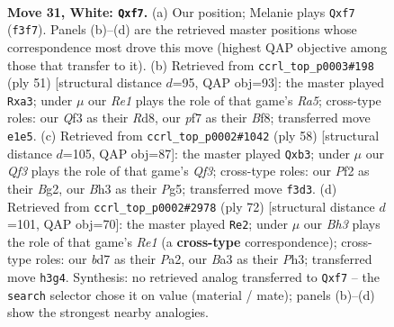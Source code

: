 \documentclass[11pt]{article}
\begin{document}
\clearpage

\begin{figure}[p]\centering
\begin{subfigure}{0.46\textwidth}\centering
\resizebox{\linewidth}{!}{%
\newchessgame
\chessboard[
  setfen={r3r2k/bp1b1pp1/p3p3/7P/8/BPqp1Q1B/P4PKP/R3R3 w - - 0 31},
  showmover=false,
  pgfstyle=straightmove, color=movearrow, markmove={f3-f7}
]}
\caption{}
\end{subfigure}\hfill
\begin{subfigure}{0.46\textwidth}\centering
\resizebox{\linewidth}{!}{%
\newchessgame
\chessboard[
  setfen={3r1bk1/1b3ppp/8/1ppPB3/r5q1/P5P1/2Q2PBP/1R1R2K1 b - - 1 26},
  showmover=false,
  pgfstyle=straightmove, color=movearrow, markmove={a4-a3}
]}
\caption{}
\end{subfigure}
\\[4pt]
\begin{subfigure}{0.46\textwidth}\centering
\resizebox{\linewidth}{!}{%
\newchessgame
\chessboard[
  setfen={1r3rk1/1b3p2/3p2p1/6Pp/2PpP2P/1p3Q2/2q2PB1/1R1R2K1 w - - 2 30},
  showmover=false,
  pgfstyle=straightmove, color=movearrow, markmove={f3-b3}
]}
\caption{}
\end{subfigure}\hfill
\begin{subfigure}{0.46\textwidth}\centering
\resizebox{\linewidth}{!}{%
\newchessgame
\chessboard[
  setfen={2r1r1k1/p4pp1/1p1pq3/2bR4/4PBQp/2P4P/P4PP1/4R1K1 w - - 3 37},
  showmover=false,
  pgfstyle=straightmove, color=movearrow, markmove={e1-e2}
]}
\caption{}
\end{subfigure}
\caption{\textbf{Move 31, White: \texttt{Qxf7}.} (a) Our position; Melanie plays \texttt{Qxf7} (\texttt{f3f7}). Panels (b)--(d) are the retrieved master positions whose correspondence most drove this move (highest QAP objective among those that transfer to it). (b) Retrieved from \texttt{ccrl\_top\_p0003\#198} (ply 51) [structural distance $d$=95, QAP obj=93]: the master played \texttt{Rxa3}; under $\mu$ our \emph{Re1} plays the role of that game's \emph{Ra5}; cross-type roles: our \emph{Q}f3 as their \emph{R}d8, our \emph{p}f7 as their \emph{B}f8; transferred move \texttt{e1e5}. (c) Retrieved from \texttt{ccrl\_top\_p0002\#1042} (ply 58) [structural distance $d$=105, QAP obj=87]: the master played \texttt{Qxb3}; under $\mu$ our \emph{Qf3} plays the role of that game's \emph{Qf3}; cross-type roles: our \emph{P}f2 as their \emph{B}g2, our \emph{B}h3 as their \emph{P}g5; transferred move \texttt{f3d3}. (d) Retrieved from \texttt{ccrl\_top\_p0002\#2978} (ply 72) [structural distance $d$=101, QAP obj=70]: the master played \texttt{Re2}; under $\mu$ our \emph{Bh3} plays the role of that game's \emph{Re1} (a \textbf{cross-type} correspondence); cross-type roles: our \emph{b}d7 as their \emph{P}a2, our \emph{B}a3 as their \emph{P}h3; transferred move \texttt{h3g4}. Synthesis: no retrieved analog transferred to \texttt{Qxf7} -- the \texttt{search} selector chose it on value (material / mate); panels (b)--(d) show the strongest nearby analogies.}
\label{fig:thought-m60}
\end{figure}
\end{document}
